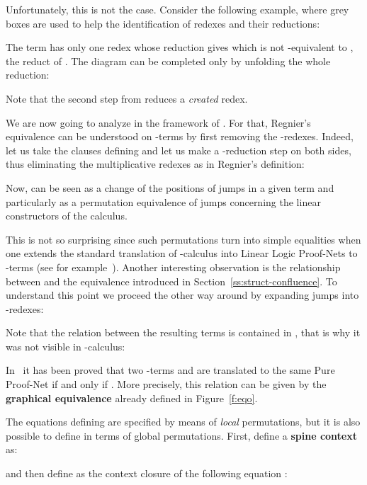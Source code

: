 \documentclass{LMCS}
\renewcommand{\>}{\rightarrow}
\newcommand{\deft}[1]{{\bf #1}}
\newcommand{\ignore}[1]{}
\begin{document}
Unfortunately, this is not
the case. Consider the following example, where 
grey boxes are used to help the identification of redexes and their reductions: 



The
term  has only one redex whose reduction gives 
which is not -equivalent to ,  the reduct of . The
diagram can be completed only by unfolding the whole reduction:
 


Note that the second step from  reduces a {\it created} redex. \medskip

We are now going to analyze  
in the framework of .  For that, Regnier's equivalence
can be understood on -terms by first removing the -redexes. Indeed,
let us take the clauses defining  and let us make a 
-reduction step on both sides, thus eliminating the multiplicative
redexes as in Regnier's definition:
 

Now,   can be seen
as a change of the positions of jumps in a given term and particularly
as a permutation equivalence of jumps concerning the linear constructors of the
calculus.

This is not so surprising since such permutations turn into simple
equalities when one extends the standard translation of -calculus
into Linear Logic Proof-Nets to -terms (see for
example~\cite{KL07}). Another interesting observation is the relationship between  and
the equivalence  introduced in
Section~\ref{ss:struct-confluence}. To understand this point we
proceed the other way around by expanding jumps into -redexes:
 
Note that 
the relation between the
resulting terms is
contained in , that is why it was not visible
in -calculus:
 

In~\cite{AccattoliTh} it has been proved that two -terms 
  and  are translated to the same Pure Proof-Net if and only if
  . More precisely, this relation
can be given by the \deft{graphical equivalence}
 already defined  in Figure~\ref{f:eqo}. 
\ignore{
\begin{figure}[ht]
 
\caption{The -equivalence relation}
\label{f:eqo}
\end{figure}
}

The equations defining  are specified by 
means of \textit{local}
permutations, but it is 
also possible to define
 in terms of global permutations. First, define 
a \deft{spine context}  as:

and then define  as the context closure of the following equation :
\end{document}
